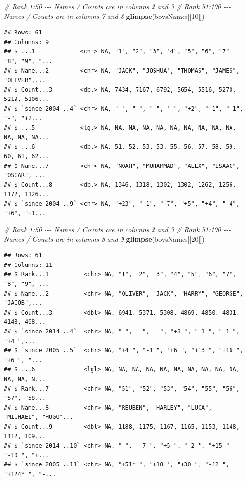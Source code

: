 \documentclass[
]{book}
\newenvironment{Shaded}{\begin{snugshade}}{\end{snugshade}}
\newcommand{\CommentTok}[1]{\textcolor[rgb]{0.56,0.35,0.01}{\textit{#1}}}
\newcommand{\DecValTok}[1]{\textcolor[rgb]{0.00,0.00,0.81}{#1}}
\newcommand{\KeywordTok}[1]{\textcolor[rgb]{0.13,0.29,0.53}{\textbf{#1}}}
\newcommand{\NormalTok}[1]{#1}
\begin{document}
\begin{Shaded}
\begin{Highlighting}[]
\CommentTok{\# Rank 1:50 {-}{-}{-} Names / Counts are in columns 2 and 3 }
\CommentTok{\# Rank 51:100 {-}{-}{-} Names / Counts are in columns 7 and 8}
\KeywordTok{glimpse}\NormalTok{(boysNames[[}\DecValTok{10}\NormalTok{]]) }
\end{Highlighting}
\end{Shaded}

\begin{verbatim}
## Rows: 61
## Columns: 9
## $ ...1             <chr> NA, "1", "2", "3", "4", "5", "6", "7", "8", "9", "...
## $ Name...2         <chr> NA, "JACK", "JOSHUA", "THOMAS", "JAMES", "OLIVER",...
## $ Count...3        <dbl> NA, 7434, 7167, 6792, 5654, 5516, 5270, 5219, 5106...
## $ `since 2004...4` <chr> NA, "-", "-", "-", "-", "+2", "-1", "-1", "-", "+2...
## $ ...5             <lgl> NA, NA, NA, NA, NA, NA, NA, NA, NA, NA, NA, NA, NA...
## $ ...6             <dbl> NA, 51, 52, 53, 53, 55, 56, 57, 58, 59, 60, 61, 62...
## $ Name...7         <chr> NA, "NOAH", "MUHAMMAD", "ALEX", "ISAAC", "OSCAR", ...
## $ Count...8        <dbl> NA, 1346, 1318, 1302, 1302, 1262, 1256, 1172, 1126...
## $ `since 2004...9` <chr> NA, "+23", "-1", "-7", "+5", "+4", "-4", "+6", "+1...
\end{verbatim}

\begin{Shaded}
\begin{Highlighting}[]
\CommentTok{\# Rank 1:50 {-}{-}{-} Names / Counts are in columns 2 and 3 }
\CommentTok{\# Rank 51:100 {-}{-}{-} Names / Counts are in columns 8 and 9}
\KeywordTok{glimpse}\NormalTok{(boysNames[[}\DecValTok{20}\NormalTok{]]) }
\end{Highlighting}
\end{Shaded}

\begin{verbatim}
## Rows: 61
## Columns: 11
## $ Rank...1          <chr> NA, "1", "2", "3", "4", "5", "6", "7", "8", "9", ...
## $ Name...2          <chr> NA, "OLIVER", "JACK", "HARRY", "GEORGE", "JACOB",...
## $ Count...3         <dbl> NA, 6941, 5371, 5308, 4869, 4850, 4831, 4148, 408...
## $ `since 2014...4`  <chr> NA, "­ ", "­ ", "­ ", "+3 ", "-1 ", "-1 ", "+4 ",...
## $ `since 2005...5`  <chr> NA, "+4 ", "-1 ", "+6 ", "+13 ", "+16 ", "+6 ", "...
## $ ...6              <lgl> NA, NA, NA, NA, NA, NA, NA, NA, NA, NA, NA, NA, N...
## $ Rank...7          <chr> NA, "51", "52", "53", "54", "55", "56", "57", "58...
## $ Name...8          <chr> NA, "REUBEN", "HARLEY", "LUCA", "MICHAEL", "HUGO"...
## $ Count...9         <dbl> NA, 1188, 1175, 1167, 1165, 1153, 1148, 1112, 109...
## $ `since 2014...10` <chr> NA, "­ ", "-7 ", "+5 ", "-2 ", "+15 ", "-10 ", "+...
## $ `since 2005...11` <chr> NA, "+51* ", "+18 ", "+30 ", "-12 ", "+124* ", "-...
\end{verbatim}
\end{document}
